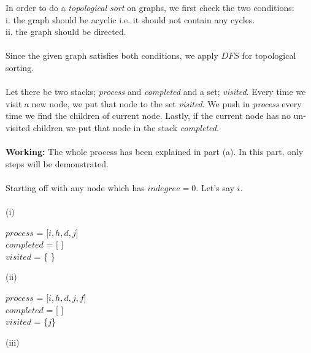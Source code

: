 \documentclass[addpoints]{exam}
\begin{document}
\begin{questions}
\begin{parts}
    \begin{solution}
    	In order to do a {\it topological sort} on graphs, we first check the two conditions:\\
    	i. the graph should be acyclic i.e. it should not contain any cycles.\\
    	ii. the graph should be directed.\\ \\
    	Since the given graph satisfies both conditions, we apply $DFS$ for topological sorting. \\ \\
    	Let there be two stacks; {\it process} and {\it completed} and a set; {\it visited}. Every time we visit a new node, we put that node to the set {\it visited}. We push in {\it process} every time we find the children of current node. Lastly, if the current node has no un-visited children we put that node in the stack {\it completed}.\\ \\
    	\textbf{Working: } The whole process has been explained in part (a). In this part, only steps will be demonstrated. \\ \\
    	Starting off with any node which has $indegree = 0$. Let's say $i$. \\ \\
    	(i)
    	\begin{center}
    		$process$ = [$i, h, d, j$]\\
    		$completed$ = [ ]\\
    		$visited$ = \{ \}\\
    	\end{center}
    	(ii)
    	\begin{center}
    		$process$ = [$i, h, d, j, f$]\\
    		$completed$ = [ ]\\
    		$visited$ = \{$j$\}\\
    	\end{center}
    	(iii)
    	\begin{center}

\end{center}
\end{solution}
\end{parts}
\end{questions}
\end{document}
